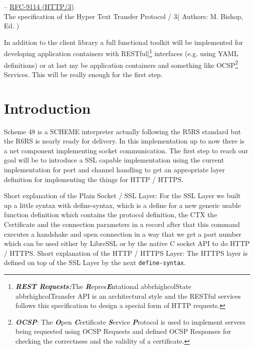 \documentclass[10pt,a4paper,english]{article}
\newcommand{\code}[1]{{\tt{#1}}}
\newcommand{\abbrhighcol}[1]{\textbf{\textit{#1}}}
\begin{document}
\begin{multicols}{2}
\begin{flushleft}
\hspace*{1em}-- \href{https://www.rfc-editor.org/rfc/rfc9114.pdf}{RFC-9114 (HTTP/3)} \\The specification of the Hyper Text Transfer Protocol / 3( Authors: M. Bishop, Ed. ) \\
\end{flushleft}\begin{flushleft}
In addition to the client library a full  functional toolkit will be implemented for developing application containers with RESTful|\footnote{\abbrhighcol {REST Requests:}The \abbrhighcol {R}epres\abbrhighcol  {E}ntational abbrhighcol{S}tate abbrhighcol{T}ransfer API is an architectural style and the RESTful services follows this specification to design a special form of HTTP requests.} interfaces (e.g. using YAML definitions) or at last my be application containers and something like OCSP\footnote{ \abbrhighcol {OCSP}: The \abbrhighcol  {O}pen \abbrhighcol {C}ertificate \abbrhighcol  {S}ervice \abbrhighcol  {P}rotocol is used to implement servers being requested using OCSP Requests and defined OCSP  Responses for checking the correctness and the validity of a certificate.} Services.
This will be really enough for the first step.
\end{flushleft}

\section{Introduction}

\begin{flushleft}
Scheme 48 is a SCHEME interpreter actually following the R5RS standard but the R6RS is nearly ready for delivery. In this implementation up to now there is a net component implementing socket communication.
The first step to reach our goal will be to introduce a SSL capable implementation using the current implementation for port and channel handling to get an appropriate layer definition for  implementing the things for HTTP / HTTPS.
\end{flushleft}
\begin{flushleft}
Short explanation of the Plain Socket / SSL Layer:
For the SSL Layer we built up a little syntax with define-syntax,  which is a define for a new generic usable function definition which contains the protocol definition, the CTX the Certificate and the connection parameters in a record after that this command executes a handshake and  open connection in a way that we  get a port number which can be used either by LibreSSL or by the native C socket API to do HTTP / HTTPS.
Short explanation of the HTTP / HTTPS Layer:
The HTTPS layer  is defined on top of the SSL Layer by the  next \code{define-syntax}.
\end{flushleft}


\end{multicols}
\end{document}
